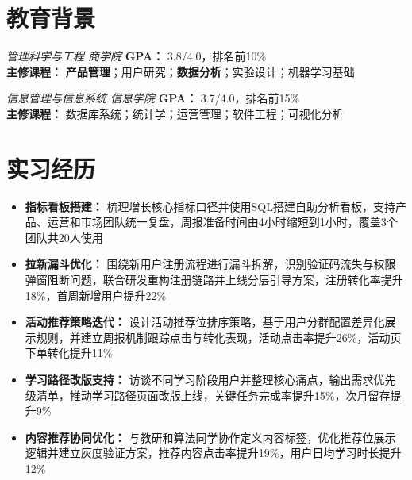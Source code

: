 \documentclass{resume}
\begin{document}
\begin{Form}



\vspace{-2pt}

\section{教育背景}
\textit{管理科学与工程 \quad 商学院} \quad \textbf{GPA：} 3.8/4.0，排名前10\% \\
\textbf{主修课程：} \textbf{产品管理}；用户研究；\textbf{数据分析}；实验设计；机器学习基础

\textit{信息管理与信息系统 \quad 信息学院} \quad \textbf{GPA：} 3.7/4.0，排名前15\% \\
\textbf{主修课程：} 数据库系统；统计学；运营管理；软件工程；可视化分析

\section{实习经历}
\vspace{-2pt}
\begin{itemize}
    \item \textbf{指标看板搭建：} 梳理增长核心指标口径并使用SQL搭建自助分析看板，支持产品、运营和市场团队统一复盘，周报准备时间由4小时缩短到1小时，覆盖3个团队共20人使用
    \item \textbf{拉新漏斗优化：} 围绕新用户注册流程进行漏斗拆解，识别验证码流失与权限弹窗阻断问题，联合研发重构注册链路并上线分层引导方案，注册转化率提升18\%，首周新增用户提升22\%
    \item \textbf{活动推荐策略迭代：} 设计活动推荐位排序策略，基于用户分群配置差异化展示规则，并建立周报机制跟踪点击与转化表现，活动点击率提升26\%，活动页下单转化提升11\%
\end{itemize}
\vspace{-2pt}

\vspace{-2pt}
\begin{itemize}
    \item \textbf{学习路径改版支持：} 访谈不同学习阶段用户并整理核心痛点，输出需求优先级清单，推动学习路径页面改版上线，关键任务完成率提升15\%，次月留存提升9\%
    \item \textbf{内容推荐协同优化：} 与教研和算法同学协作定义内容标签，优化推荐位展示逻辑并建立灰度验证方案，推荐内容点击率提升19\%，用户日均学习时长提升12\%
\end{itemize}
\vspace{-2pt}


\end{Form}
\end{document}
